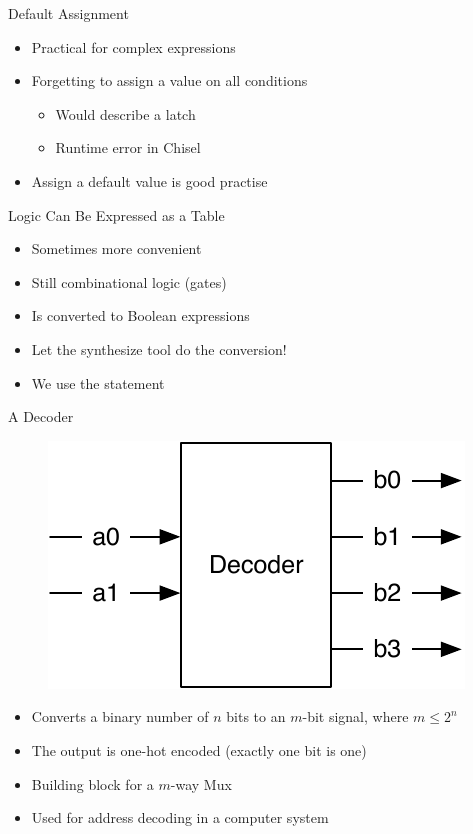\begin{frame}[fragile]{Default Assignment}
\begin{itemize}
\item Practical for complex expressions
\item Forgetting to assign a value on all conditions
\begin{itemize}
\item Would describe a latch
\item Runtime error in Chisel
\end{itemize}
\item Assign a default value is good practise
\end{itemize}
\end{frame}

\begin{frame}[fragile]{Logic Can Be Expressed as a Table}
\begin{itemize}
\item Sometimes more convenient 
\item Still combinational logic (gates)
\item Is converted to Boolean expressions
\item Let the synthesize tool do the conversion!
\item We use the  statement
\end{itemize}
\end{frame}


\begin{frame}[fragile]{A Decoder}
\begin{figure}
  \includegraphics[scale=\scale]{../figures/decoder}
\end{figure}
\begin{itemize}
\item Converts a binary number of $n$ bits to an $m$-bit signal, where $m \leq 2^n$
\item The output is one-hot encoded (exactly one bit is one)
\item Building block for a $m$-way Mux
\item Used for address decoding in a computer system
\end{itemize}
\end{frame}

